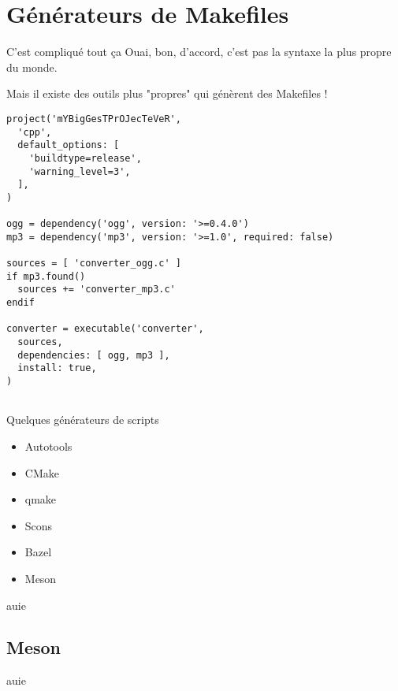 \section{Générateurs de Makefiles}
\begin{frame}[fragile]{C'est compliqué tout ça\…}
Ouai, bon, d'accord, c'est pas la syntaxe la plus propre du monde.

\… Mais il existe des outils plus "propres" qui génèrent des Makefiles !
\begin{lstlisting}
project('mYBigGesTPrOJecTeVeR',
  'cpp',
  default_options: [
    'buildtype=release',
    'warning_level=3',
  ],
)

ogg = dependency('ogg', version: '>=0.4.0')
mp3 = dependency('mp3', version: '>=1.0', required: false)

sources = [ 'converter_ogg.c' ]
if mp3.found()
  sources += 'converter_mp3.c'
endif

converter = executable('converter',
  sources,
  dependencies: [ ogg, mp3 ],
  install: true,
)
  
\end{lstlisting}
\end{frame}

\begin{frame}{Quelques générateurs de scripts}
\begin{itemize}
  \item Autotools 
  \item CMake 
  \item qmake 
  \item Scons 
  \item Bazel 
  \item Meson 
\end{itemize}
\end{frame}

\begin{frame} auie \end{frame}
\subsection{Meson}
\begin{frame} auie \end{frame}
